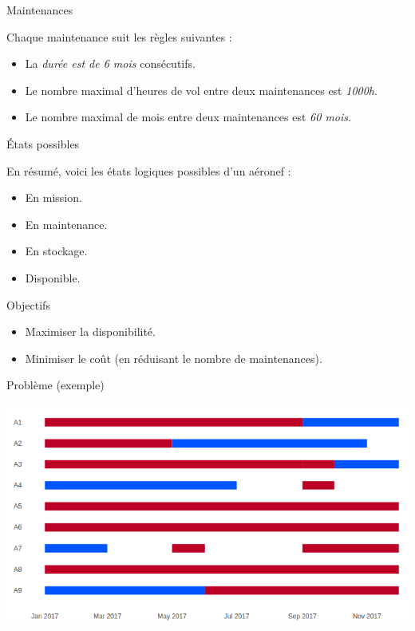 \documentclass[ignorenonframetext,]{beamer}
\providecommand{\tightlist}{%
  \setlength{\itemsep}{0pt}\setlength{\parskip}{0pt}}
\begin{document}
\begin{frame}{Maintenances}

Chaque maintenance suit les règles suivantes :

\begin{itemize}[<+->]
\tightlist
\item
  La \emph{durée est de 6 mois} consécutifs.
\item
  Le nombre maximal d'heures de vol entre deux maintenances est
  \emph{1000h}.
\item
  Le nombre maximal de mois entre deux maintenances est \emph{60 mois}.
\end{itemize}

\end{frame}

\begin{frame}{États possibles}

En résumé, voici les états logiques possibles d'un aéronef :

\begin{itemize}[<+->]
\tightlist
\item
  En mission.
\item
  En maintenance.
\item
  En stockage.
\item
  Disponible.
\end{itemize}

\end{frame}

\begin{frame}{Objectifs}

\begin{itemize}[<+->]
\tightlist
\item
  Maximiser la disponibilité.
\item
  Minimiser le coût (en réduisant le nombre de maintenances).
\end{itemize}

\end{frame}

\begin{frame}{Problème (exemple)}

\includegraphics[width=1\linewidth]{./../../img/calendar}

\end{frame}
\end{document}
